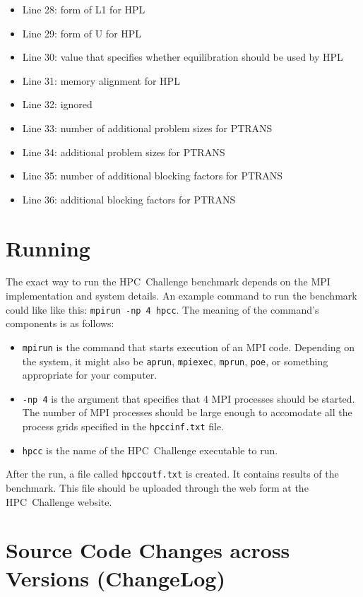 \documentclass[twocolumn]{article}
\begin{document}
\begin{itemize}
\item Line 28: form of L1 for HPL
\item Line 29: form of U for HPL
\item Line 30: value that specifies whether equilibration should be used by HPL
\item Line 31: memory alignment for HPL
\item Line 32: ignored
\item Line 33: number of additional problem sizes for PTRANS
\item Line 34: additional problem sizes for PTRANS
\item Line 35: number of additional blocking factors for PTRANS
\item Line 36: additional blocking factors for PTRANS
\end{itemize}

\section{Running}
The exact way to run the HPC~Challenge benchmark depends on the MPI
implementation and system details.  An example command to run the
benchmark could like like this: \texttt{mpirun -np 4 hpcc}. The
meaning of the command's components is as follows:
\begin{itemize}
\item \texttt{mpirun} is the command that starts execution of an MPI
code. Depending on the system, it might also be \texttt{aprun},
\texttt{mpiexec}, \texttt{mprun}, \texttt{poe}, or something
appropriate for your computer.

\item \texttt{-np 4} is the argument that specifies that 4 MPI
processes should be started. The number of MPI processes should be
large enough to accomodate all the process grids specified in the
\texttt{hpccinf.txt} file.

\item \texttt{hpcc} is the name of the HPC~Challenge executable to
run.
\end{itemize}

After the run, a file called \texttt{hpccoutf.txt} is created. It
contains results of the benchmark. This file should be uploaded
through the web form at the HPC~Challenge website.

\section{Source Code Changes across Versions (ChangeLog)}
\end{document}
